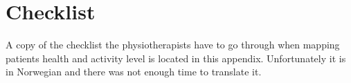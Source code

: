 \chapter{Checklist}
\label{checklist}
A copy of the checklist the physiotherapists have to go through when mapping patients health and activity level is located in this appendix. Unfortunately it is in Norwegian and there was not enough time to translate it. 
